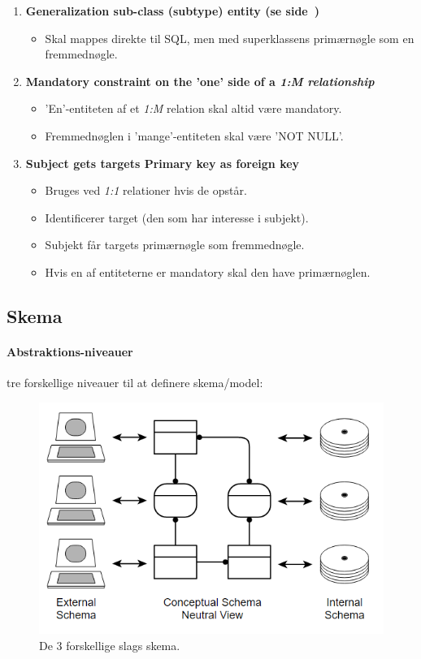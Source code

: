 \begin{enumerate}
	\item \textbf{Generalization sub-class (subtype) entity (se side~\pageref{sec:arv})}
	\begin{itemize}
		\item Skal mappes direkte til SQL, men med superklassens primærnøgle som en fremmednøgle.
	\end{itemize}
	
	\item \textbf{Mandatory constraint on the 'one' side of a \textit{1:M relationship}}
	\begin{itemize}
		\item 'En'-entiteten af et \textit{1:M} relation skal altid være mandatory.
		\item Fremmednøglen i 'mange'-entiteten skal være 'NOT NULL'.
	\end{itemize}
		
	\item \textbf{Subject gets targets Primary key as foreign key}
	\begin{itemize}
		\item Bruges ved \textit{1:1} relationer hvis de opstår.
		\item Identificerer target (den som har interesse i subjekt).
		\item Subjekt får targets primærnøgle som fremmednøgle.
		\item Hvis en af entiteterne er mandatory skal den have primærnøglen.
	\end{itemize}
	
\end{enumerate}

\subsection{Skema}

\paragraph{Abstraktions-niveauer} tre forskellige niveauer til at definere skema/model:

\begin{figure}[h]
\centering
\includegraphics[width=0.7\linewidth]{figs/spm2/skema}
\caption{De 3 forskellige slags skema.}
\label{fig:skema}
\end{figure}


